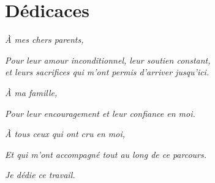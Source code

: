 \chapter*{Dédicaces}

\vspace{2cm}

\begin{center}
\Large

\textit{À mes chers parents,}

\vspace{0.5cm}

\textit{Pour leur amour inconditionnel, leur soutien constant,}\\
\textit{et leurs sacrifices qui m'ont permis d'arriver jusqu'ici.}

\vspace{1.5cm}

\textit{À ma famille,}

\vspace{0.5cm}

\textit{Pour leur encouragement et leur confiance en moi.}

\vspace{1.5cm}

\textit{À tous ceux qui ont cru en moi,}

\vspace{0.5cm}

\textit{Et qui m'ont accompagné tout au long de ce parcours.}

\vspace{2cm}

\textit{Je dédie ce travail.}

\end{center}

